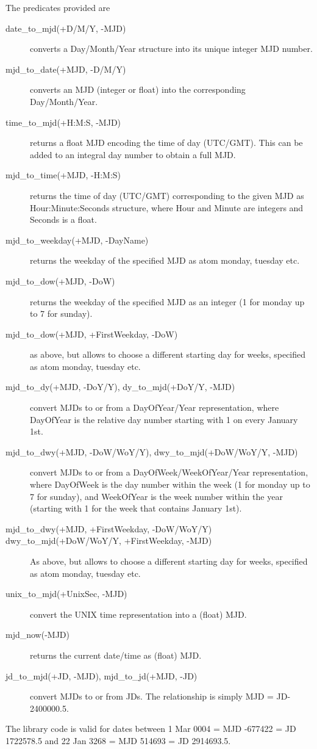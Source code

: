 The predicates provided are
\begin{description}
\item[date_to_mjd(+D/M/Y, -MJD)] converts a Day/Month/Year structure into
	its unique integer MJD number.
\item[mjd_to_date(+MJD, -D/M/Y)] converts an MJD
	(integer or float) into the corresponding Day/Month/Year.
\item[time_to_mjd(+H:M:S, -MJD)] returns a float MJD  encoding the
	time of day (UTC/GMT). This can be added to an integral day number
	to obtain a full MJD.
\item[mjd_to_time(+MJD, -H:M:S)] returns the time of day (UTC/GMT)
	corresponding to the given MJD as Hour:Minute:Seconds structure,
	where Hour and Minute are integers and Seconds is a float.
\item[mjd_to_weekday(+MJD, -DayName)] returns the weekday of the
	specified MJD as atom monday, tuesday etc.
\item[mjd_to_dow(+MJD, -DoW)] returns the weekday of the
	specified MJD as an integer (1 for monday up to 7 for sunday).
\item[mjd_to_dow(+MJD, +FirstWeekday, -DoW)] as above, but allows to choose
	a different starting day for weeks, specified as atom monday,
	tuesday etc.
\item[mjd_to_dy(+MJD, -DoY/Y), dy_to_mjd(+DoY/Y, -MJD)] convert MJDs
	to or from a DayOfYear/Year representation, where DayOfYear is
	the relative day number starting with 1 on every January 1st.
\item[mjd_to_dwy(+MJD, -DoW/WoY/Y), dwy_to_mjd(+DoW/WoY/Y, -MJD)] convert
	MJDs to or from a DayOfWeek/WeekOfYear/Year representation, where
	DayOfWeek is the day number within the week (1 for monday up to
	7 for sunday), and WeekOfYear is the week number within the year
	(starting with 1 for the week that contains January 1st).
\item[mjd_to_dwy(+MJD, +FirstWeekday, -DoW/WoY/Y)]
\item[dwy_to_mjd(+DoW/WoY/Y, +FirstWeekday, -MJD)]
	As above, but allows to choose a different starting day for weeks,
	specified as atom monday, tuesday etc.
\item[unix_to_mjd(+UnixSec, -MJD)] convert the UNIX time representation
	into a (float) MJD.
\item[mjd_now(-MJD)] returns the current date/time as (float) MJD.
\item[jd_to_mjd(+JD, -MJD), mjd_to_jd(+MJD, -JD)] convert MJDs to or
	from JDs. The relationship is simply MJD = JD-2400000.5.
\end{description}
The library code is valid for dates between
	 1 Mar 0004 = MJD -677422 = JD 1722578.5
and
	22 Jan 3268 = MJD  514693 = JD 2914693.5.

